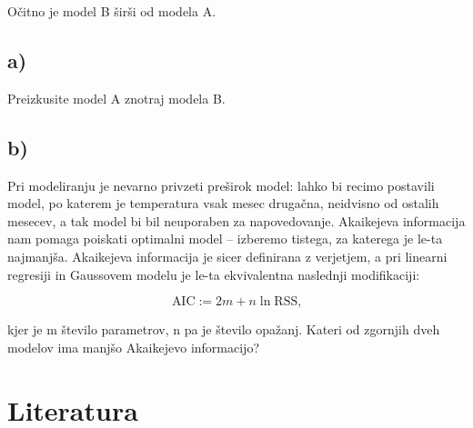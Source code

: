 \documentclass[12pt, a4paper]{article}
\begin{document}
Očitno je model B širši od modela A.

\subsection*{a)}

Preizkusite model A znotraj modela B.

\subsection*{b)}
Pri modeliranju je nevarno privzeti preširok model: lahko bi recimo postavili
model, po katerem je temperatura vsak mesec drugačna, neidvisno od ostalih
mesecev, a tak model bi bil neuporaben za napovedovanje. Akaikejeva 
informacija nam pomaga poiskati optimalni model – izberemo tistega, za katerega
je le-ta najmanjša. Akaikejeva informacija je sicer definirana z verjetjem, 
a pri linearni regresiji in Gaussovem modelu je le-ta ekvivalentna naslednji 
modifikaciji:

\[
    \text{AIC} := 2m + n \ln \text{RSS,}
    \]

kjer je m število parametrov, n pa je število opažanj. Kateri od zgornjih dveh
modelov ima manjšo Akaikejevo informacijo?



\section*{Literatura}
\end{document}
